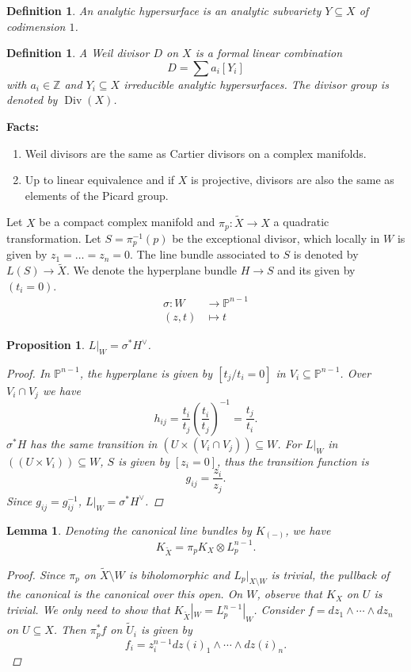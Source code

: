 \documentclass[12pt]{article}
\theoremstyle{darkgreentheorem}
\newtheorem{lm}[thm]{Lemma}
\newtheorem{prop}[thm]{Proposition}
\theoremstyle{darkbluedefinition}
\newtheorem{defn}[thm]{Definition}
\theoremstyle{darkredexample}
\theoremstyle{remark}
\newcommand{\Z}{\mathbb{Z}}
\newcommand{\1}{\mathbbm{1}}
\renewcommand{\P}{\mathbb{P}}
\DeclareMathOperator{\Div}{Div}
\newcommand{\ot}{\otimes}
\newcommand{\dual}{^{\vee}}
\newcommand{\tms}{\times}
\newcommand{\sub}{\subseteq}
\begin{document}
\begin{defn}
    An \textit{analytic hypersurface} is an analytic subvariety $Y\sub X$ of codimension $1$.
\end{defn}

\begin{defn}
    A \textit{Weil divisor} $D$ on $X$ is a formal linear combination
    \[ D=\sum a_{i}[Y_{i}] \]
    with $a_{i}\in \Z$ and $Y_{i}\sub X$ irreducible analytic hypersurfaces.
    The divisor group is denoted by $\Div(X)$.
\end{defn}

\textbf{Facts:}
\begin{enumerate}
    \item Weil divisors are the same as Cartier divisors on a complex manifolds.
    \item Up to linear equivalence and if $X$ is projective, divisors are also the same as elements of the Picard group.
\end{enumerate}

Let $X$ be a compact complex manifold and $\pi_{p}\colon \tilde{X}\to X$ a quadratic transformation.
Let $S=\pi_{p}^{-1}(p)$ be the exceptional divisor, which locally in $W$ is given by $z_{1}=\ldots =z_{n}=0$.
The line bundle associated to $S$ is denoted by $L(S)\to \tilde{X}$.
We denote the hyperplane bundle $H\to S$ and its given by $(t_{i}=0)$.
\begin{align*}
    \sigma \colon W & \to \P^{n-1} \\
    (z,t) & \mapsto t
\end{align*}

\begin{prop}
    $L|_{W}=\sigma^{*}H\dual$.
    \begin{proof}
	In $\P^{n-1}$, the hyperplane is given by $[t_{j}/t_{i}=0]$ in $V_{i}\sub \P^{n-1}$.
	Over $V_{i}\cap V_{j}$ we have
	\[ h_{ij}=\frac{t_{i}}{t_{j}}\left(\frac{t_{i}}{t_{j}}\right)^{-1}=\frac{t_{j}}{t_{i}}.\]
	$\sigma^{*}H$ has the same transition in $(U\tms (V_{i}\cap V_{j}))\sub W$.
	For $L|_{W}$ in $((U\tms V_{i}))\sub W$, $S$ is given by $[z_{i}=0]$, thus the transition function is
	\[ g_{ij}=\frac{z_{i}}{z_{j}}. \]
	Since $g_{ij}=g_{ij}^{-1}$, $L|_{W}=\sigma^{*}H\dual $.
    \end{proof}
\end{prop}

\begin{lm}
    Denoting the canonical line bundles by $K_{(-)}$, we have
    \[ K_{\tilde{X}}=\pi_{p}K_{X}\ot L_{p}^{n-1}. \]
    \begin{proof}
	Since $\pi_{p}$ on $\tilde{X}\setminus W$ is biholomorphic and $L_{p}|_{X\setminus W}$ is trivial, the pullback of the canonical is the canonical over this open.
	On $W$, observe that $K_{X}$ on $U$ is trivial.
	We only need to show that $K_{\tilde{X}}|_{W}=L_{p}^{n-1}|_{W}$.
	Consider $f=dz_{1}\wedge \cdots \wedge dz_{n}$ on $U\sub X$.
	Then $\pi_{p}^{*}f$ on $\tilde{U}_{i}$ is given by
	\[ f_{i}=z_{i}^{n-1}dz(i)_{1}\wedge \cdots \wedge dz(i)_{n}.\]
    \end{proof}
\end{lm}
\end{document}
